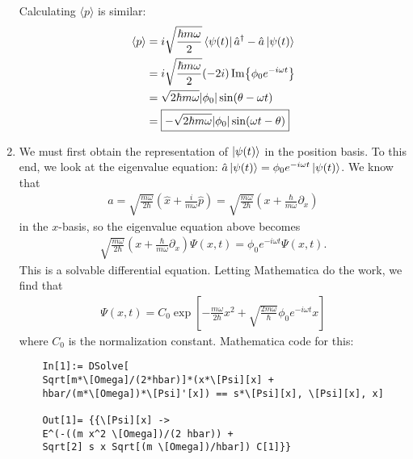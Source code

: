 \documentclass{article}
\theoremstyle{definition}
\newcommand{\p}{\partial}
\newcommand{\f}[2]{\frac{#1}{#2}}
\newcommand{\lp}{\left(}
\newcommand{\rp}{\right)}
\newcommand{\lb}{\left[}
\newcommand{\rb}{\right]}
\begin{document}
\begin{enumerate}[label=(\alph*)]
	
	Calculating $\langle p \rangle$ is similar:
	\begin{align*}
	\langle p \rangle 
	&= i\sqrt{\f{\hbar m \omega}{2}} \bra{\psi(t)} \hat a^\dagger - \hat a \ket{\psi(t)}\\
	&=  i\sqrt{\f{\hbar m \omega}{2}}(-2i)\Im{\phi_0 e^{-i\omega t}}\\
	&= \sqrt{2\hbar m \omega} \abs{\phi_0}\sin(\theta - \omega t) \\
	&= \boxed{- \sqrt{2\hbar m \omega} \abs{\phi_0}\sin(\omega t - \theta) }
	\end{align*}
	
	\item We must first obtain the representation of $\ket{\psi(t)}$ in the position basis. To this end, we look at the eigenvalue equation: $\hat a \ket{\psi(t)} = \phi_0 e^{-i\omega t}\ket{\psi(t)}$. We know that 
	\begin{align*}
	\hat a = \sqrt{\f{m\omega}{2\hbar}}\lp \hat x + \f{i}{m\omega} \hat p\rp = \sqrt{\f{m\omega}{2\hbar}}\lp x + \f{\hbar}{m\omega} \p_x \rp 
	\end{align*}  
	in the $x$-basis, so the eigenvalue equation above becomes
	\begin{align*}
	\sqrt{\f{m\omega}{2\hbar}}\lp x + \f{\hbar}{m\omega} \p_x \rp  \Psi(x,t) = \phi_0 e^{-i\omega t} \Psi(x,t).
	\end{align*}
	This is a solvable differential equation. Letting Mathematica do the work, we find that
	\begin{align*}
	\Psi(x,t) = C_0\exp\lb -\f{m\omega}{2\hbar}x^2 + \sqrt{\f{2m\omega}{\hbar}} \phi_0 e^{-i\omega t} x  \rb
	\end{align*}
	where $C_0$ is the normalization constant. Mathematica code for this:
	\begin{lstlisting}
	In[1]:= DSolve[
	Sqrt[m*\[Omega]/(2*hbar)]*(x*\[Psi][x] + 
	hbar/(m*\[Omega])*\[Psi]'[x]) == s*\[Psi][x], \[Psi][x], x]
	
	Out[1]= {{\[Psi][x] -> 
	E^(-((m x^2 \[Omega])/(2 hbar)) + 
	Sqrt[2] s x Sqrt[(m \[Omega])/hbar]) C[1]}}
	\end{lstlisting}
	

\end{enumerate}
\end{document}
